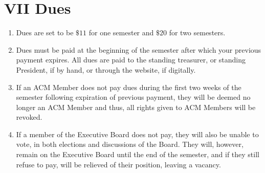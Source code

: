 
\section{VII \textendash{} Dues}
\begin{enumerate}
  \item	Dues are set to be $\$11$ for one semester and $\$20$ for two semesters.
  \item	Dues must be paid at the beginning of the semester after which your
  previous payment expires. All dues are paid to the standing treasurer, or
  standing President, if by hand, or
  through the website, if digitally.
  \item If an ACM Member does not pay dues during the first two weeks of the
  semester following expiration of previous payment, they will be deemed no
  longer an ACM Member and thus, all rights given to ACM Members will be
  revoked.
  \item If a member of the Executive Board does not pay, they will also be unable to
  vote, in both elections and discussions of the Board. They will, however,
  remain on the Executive Board until the end of the semester, and if they still
  refuse to pay, will be relieved of their position, leaving a vacancy.
\end{enumerate}

